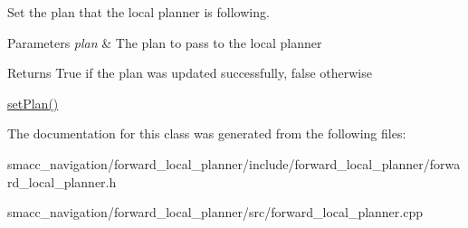 Set the plan that the local planner is following. 


\begin{DoxyParams}{Parameters}
{\em plan} & The plan to pass to the local planner \\
\hline
\end{DoxyParams}
\begin{DoxyReturn}{Returns}
True if the plan was updated successfully, false otherwise
\end{DoxyReturn}
\hyperlink{classforward__local__planner_1_1ForwardLocalPlanner_a63db153f4977a9336dc992cb92415cd7}{set\-Plan()} 

The documentation for this class was generated from the following files\-:\begin{DoxyCompactItemize}
\item 
smacc\-\_\-navigation/forward\-\_\-local\-\_\-planner/include/forward\-\_\-local\-\_\-planner/forward\-\_\-local\-\_\-planner.\-h\item 
smacc\-\_\-navigation/forward\-\_\-local\-\_\-planner/src/forward\-\_\-local\-\_\-planner.\-cpp\end{DoxyCompactItemize}
